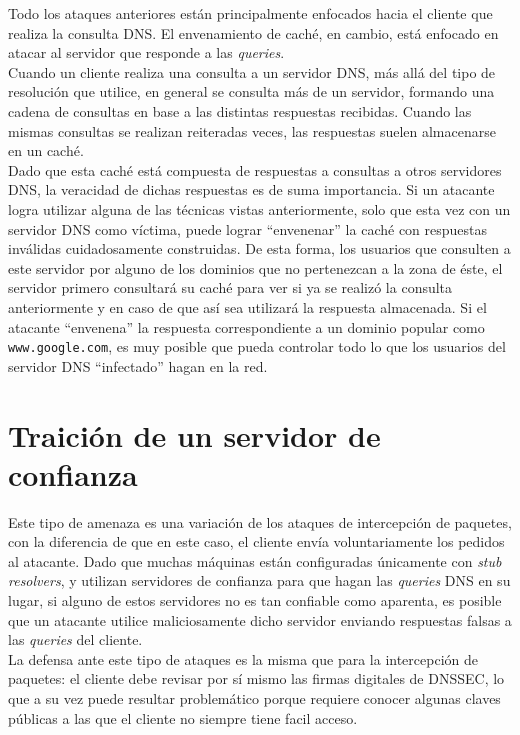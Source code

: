Todo los ataques anteriores est\'an principalmente enfocados hacia el cliente que realiza la consulta DNS. El envenamiento de cach\'e, en cambio, est\'a enfocado en atacar al servidor que responde a las \textit{queries}.\\
Cuando un cliente realiza una consulta a un servidor DNS, m\'as all\'a del tipo de resoluci\'on que utilice, en general se consulta m\'as de un servidor, formando una cadena de consultas en base a las distintas respuestas recibidas. Cuando las mismas consultas se realizan reiteradas veces, las respuestas suelen almacenarse en un cach\'e.\\
Dado que esta cach\'e est\'a compuesta de respuestas a consultas a otros servidores DNS, la veracidad de dichas respuestas es de suma importancia. Si un atacante logra utilizar alguna de las t\'ecnicas vistas anteriormente, solo que esta vez con un servidor DNS como v\'ictima, puede lograr
``envenenar'' la cach\'e con respuestas inv\'alidas cuidadosamente construidas. De esta forma, los usuarios que consulten a este servidor por
alguno de los dominios que no pertenezcan a la zona de \'este, el servidor primero consultar\'a su cach\'e para ver si ya se realiz\'o la consulta
anteriormente y en caso de que as\'i sea utilizar\'a la respuesta almacenada. Si el atacante ``envenena'' la respuesta correspondiente a un
dominio popular como \texttt{www.google.com}, es muy posible que pueda controlar todo lo que los usuarios del servidor DNS ``infectado'' hagan en la red.

\section{Traici\'on de un servidor de confianza}
Este tipo de amenaza es una variaci\'on de los ataques de intercepci\'on de paquetes, con la diferencia de que en este caso, el cliente env\'ia voluntariamente los pedidos al atacante. Dado que muchas m\'aquinas est\'an configuradas \'unicamente con \textit{stub resolvers}, y utilizan servidores de confianza para que hagan las \textit{queries} DNS en su lugar, si alguno de estos servidores no es tan confiable como aparenta, es posible que un atacante utilice maliciosamente dicho servidor enviando respuestas falsas a las \textit{queries} del cliente.\\
La defensa ante este tipo de ataques es la misma que para la intercepci\'on de paquetes: el cliente debe revisar por s\'i mismo las firmas digitales de DNSSEC, lo que a su vez puede resultar problem\'atico porque requiere conocer algunas claves p\'ublicas a las que el cliente no siempre tiene facil acceso.


